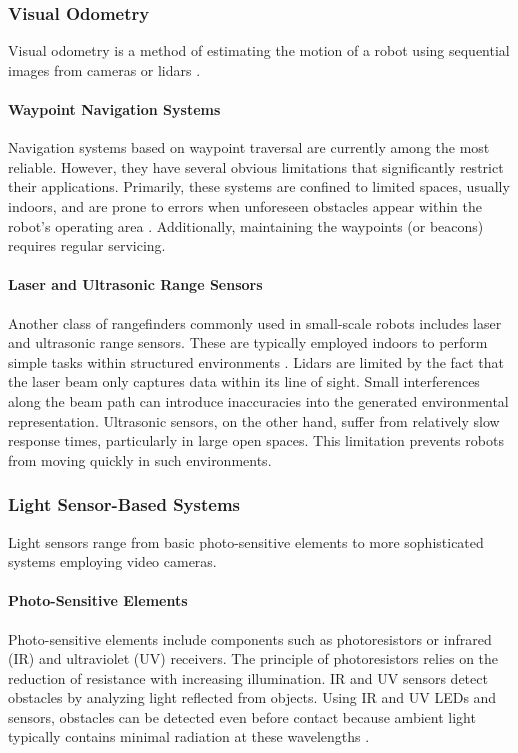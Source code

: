 \subsubsection{Visual Odometry}
Visual odometry is a method of estimating the motion of a robot using sequential images from cameras or lidars \citep{Scaramuzza2011}.

\paragraph{Waypoint Navigation Systems}
Navigation systems based on waypoint traversal are currently among the most reliable. However, they have several obvious limitations that significantly restrict their applications. Primarily, these systems are confined to limited spaces, usually indoors, and are prone to errors when unforeseen obstacles appear within the robot's operating area \citep{Borenstein1996WhereAI}. Additionally, maintaining the waypoints (or beacons) requires regular servicing.


\paragraph{Laser and Ultrasonic Range Sensors}
Another class of rangefinders commonly used in small-scale robots includes laser and ultrasonic range sensors. These are typically employed indoors to perform simple tasks within structured environments . Lidars are limited by the fact that the laser beam only captures data within its line of sight. Small interferences along the beam path can introduce inaccuracies into the generated environmental representation. Ultrasonic sensors, on the other hand, suffer from relatively slow response times, particularly in large open spaces. This limitation prevents robots from moving quickly in such environments.

\subsubsection{Light Sensor-Based Systems}
Light sensors range from basic photo-sensitive elements to more sophisticated systems employing video cameras.

\paragraph{Photo-Sensitive Elements}
Photo-sensitive elements include components such as photoresistors or infrared (IR) and ultraviolet (UV) receivers. The principle of photoresistors relies on the reduction of resistance with increasing illumination. IR and UV sensors detect obstacles by analyzing light reflected from objects. Using IR and UV LEDs and sensors, obstacles can be detected even before contact because ambient light typically contains minimal radiation at these wavelengths \citep{Logitech2020, SensoricSolutions}.

